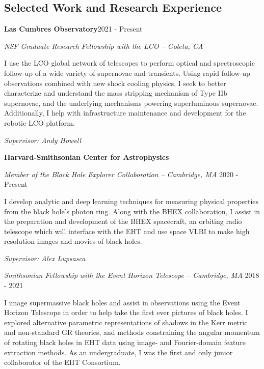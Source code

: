 \documentclass[margin,line]{res}
\begin{document}
\begin{resume}
\vspace{+.4cm}
\section{\sc Selected Work and Research Experience}
{\bf Las Cumbres Observatory}\hfill 2021 - Present


\vspace{-.4cm}
{\em NSF Graduate Research Fellowship with the LCO -- Goleta, CA}

\begin{changemargin}{-0.0cm}{2.5cm} 
I use the LCO global network of telescopes to perform optical and spectroscopic follow-up of a wide variety of supernovae and transients. Using rapid follow-up observations combined with new shock cooling physics, I seek to better characterize and understand the mass stripping mechanism of Type IIb supernovae, and the underlying mechanisms powering superluminous supernovae. Additionally, I help with infrastructure maintenance and development for the robotic LCO platform.

\textit{Supervisor: Andy Howell}
\end{changemargin}



{\bf Harvard-Smithsonian Center for Astrophysics}

\vspace{-.4cm}
{\em Member of the Black Hole Explorer Collaboration -- Cambridge, MA} \hfill 2020 - Present

\begin{changemargin}{-0.0cm}{2.5cm} 
I develop analytic and deep learning techniques for measuring physical properties from the black hole's photon ring. Along with the BHEX collaboration, I assist in the preparation and development of the BHEX spacecraft, an orbiting radio telescope which will interface with the EHT and use space VLBI to make high resolution images and movies of black holes.

\textit{Supervisor: Alex Lupsasca}
\end{changemargin}


{\em Smithsonian Fellowship with the Event Horizon Telescope -- Cambridge, MA} \hfill 2018 - 2021

\begin{changemargin}{-0.0cm}{2.5cm} 
I image supermassive black holes and assist in observations using the Event Horizon Telescope in order to help take the first ever pictures of black holes. I explored alternative parametric representations of shadows in the Kerr metric and non-standard GR theories, and methods constraining the angular momentum of rotating black holes in EHT data using image- and Fourier-domain feature extraction methods. As an undergraduate, I was the first and only junior collaborator of the EHT Consortium. 


\end{changemargin}
\end{resume}
\end{document}
